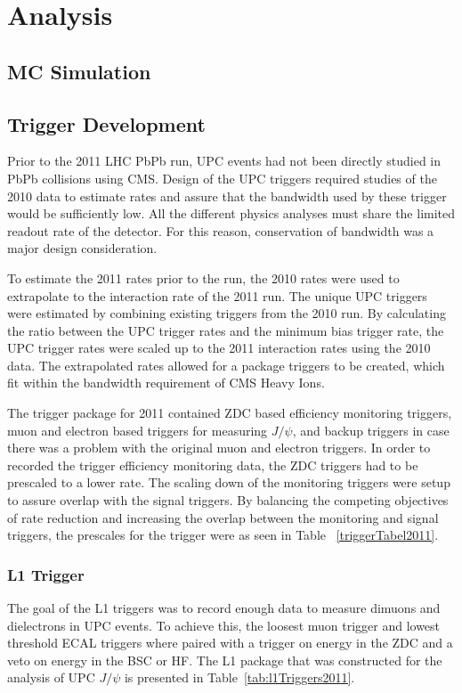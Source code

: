 \chapter{Analysis}	
  \section{MC Simulation}
  \section{\label{sec:TrigDev} Trigger Development} 
    Prior to the 2011 LHC PbPb run, UPC events had not been directly studied in 
      PbPb collisions using CMS. 
    Design of the UPC triggers required studies of the 2010 data to estimate 
      rates and assure that the bandwidth used by these trigger would be
      sufficiently low. 
    All the different physics analyses must share the limited readout rate of 
      the detector.
    For this reason, conservation of bandwidth was a major design consideration.

    To estimate the 2011 rates prior to the run, the 2010 rates were used to 
      extrapolate to the interaction rate of the 2011 run. 
    The unique UPC triggers were estimated by combining existing triggers from
      the 2010 run. 
    By calculating the ratio between the UPC trigger rates and the minimum bias
      trigger rate, the UPC trigger rates were scaled up to the 2011 
      interaction rates using the 2010 data. 
    The extrapolated rates allowed for a package triggers to be created, which 
      fit within the bandwidth requirement of CMS Heavy Ions. 
    
    The trigger package for 2011 contained ZDC based efficiency monitoring 
      triggers, muon and electron based triggers for measuring $J/\psi$, and 
      backup triggers in case there was a problem with the original muon and 
      electron triggers.
    In order to recorded the trigger efficiency monitoring data, the ZDC 
      triggers had to be prescaled to a lower rate. 
    The scaling down of the monitoring triggers were setup to assure overlap
      with the signal triggers.
    By balancing the competing objectives of rate reduction and increasing 
      the overlap between the monitoring and signal triggers, 
      the prescales for the trigger were as seen in Table ~\ref{triggerTabel2011}.

    \subsection{L1 Trigger}
      The goal of the L1 triggers was to record enough data to measure dimuons
        and dielectrons in UPC events.
      To achieve this, the loosest muon trigger and lowest threshold ECAL 
        triggers where paired with a trigger on energy in the ZDC and a veto on
	energy in the BSC or HF.
      The L1 package that was constructed for the analysis of UPC $J/\psi$ 
        is presented in Table~\ref{tab:l1Triggers2011}.

